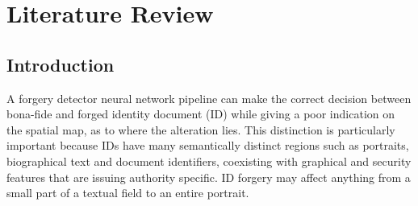 
\chapter{Literature Review}
\label{ch:litreview}




\section{Introduction} \label{sec:lr-intro} A forgery detector neural network pipeline can make the correct decision between bona-fide and forged identity document (ID) while giving a poor indication on the spatial map, as to where the alteration lies. This distinction is particularly important because IDs have many semantically distinct regions such as portraits, biographical text and document identifiers, coexisting with graphical and security features that are issuing authority specific. ID forgery may affect anything from a small part of a textual field to an entire portrait. 

